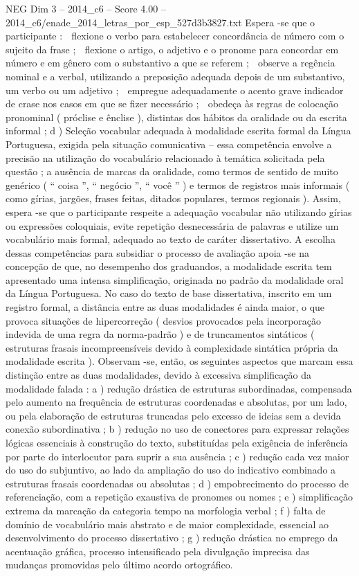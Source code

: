 \begin{textsample}{NEG Dim 3 – 2014\_c6 – Score 4.00 – 2014\_c6/enade\_2014\_letras\_por\_esp\_527d3b3827.txt}
Espera -se que o participante :  flexione o verbo para estabelecer concordância de número com o sujeito da frase ;  flexione o artigo, o adjetivo e o pronome para concordar em número e em gênero com o substantivo a que se referem ;  observe a regência nominal e a verbal, utilizando a preposição adequada depois de um substantivo, um verbo ou um adjetivo ;  empregue adequadamente o acento grave indicador de crase nos casos em que se fizer necessário ;  obedeça às regras de colocação pronominal ( próclise e ênclise ), distintas dos hábitos da oralidade ou da escrita informal ; d ) Seleção vocabular adequada à modalidade escrita formal da Língua Portuguesa, exigida pela situação comunicativa – essa competência envolve a precisão na utilização do vocabulário relacionado à temática solicitada pela questão ; a ausência de marcas da oralidade, como termos de sentido de muito genérico ( “ coisa ”, “ negócio ”, “ você ” ) e termos de registros mais informais ( como gírias, jargões, frases feitas, ditados populares, termos regionais ).
Assim, espera -se que o participante respeite a adequação vocabular não utilizando gírias ou expressões coloquiais, evite repetição desnecessária de palavras e utilize um vocabulário mais formal, adequado ao texto de caráter dissertativo.
A escolha dessas competências para subsidiar o processo de avaliação apoia -se na concepção de que, no desempenho dos graduandos, a modalidade escrita tem apresentado uma intensa simplificação, originada no padrão da modalidade oral da Língua Portuguesa.
No caso do texto de base dissertativa, inscrito em um registro formal, a distância entre as duas modalidades é ainda maior, o que provoca situações de hipercorreção ( desvios provocados pela incorporação indevida de uma regra da norma-padrão ) e de truncamentos sintáticos ( estruturas frasais incompreensíveis devido à complexidade sintática própria da modalidade escrita ).
Observam -se, então, os seguintes aspectos que marcam essa distinção entre as duas modalidades, devido à excessiva simplificação da modalidade falada : a ) redução drástica de estruturas subordinadas, compensada pelo aumento na frequência de estruturas coordenadas e absolutas, por um lado, ou pela elaboração de estruturas truncadas pelo excesso de ideias sem a devida conexão subordinativa ; b ) redução no uso de conectores para expressar relações lógicas essenciais à construção do texto, substituídas pela exigência de inferência por parte do interlocutor para suprir a sua ausência ; c ) redução cada vez maior do uso do subjuntivo, ao lado da ampliação do uso do indicativo combinado a estruturas frasais coordenadas ou absolutas ; d ) empobrecimento do processo de referenciação, com a repetição exaustiva de pronomes ou nomes ; e ) simplificação extrema da marcação da categoria tempo na morfologia verbal ; f ) falta de domínio de vocabulário mais abstrato e de maior complexidade, essencial ao desenvolvimento do processo dissertativo ; g ) redução drástica no emprego da acentuação gráfica, processo intensificado pela divulgação imprecisa das mudanças promovidas pelo último acordo ortográfico.

\end{textsample}
